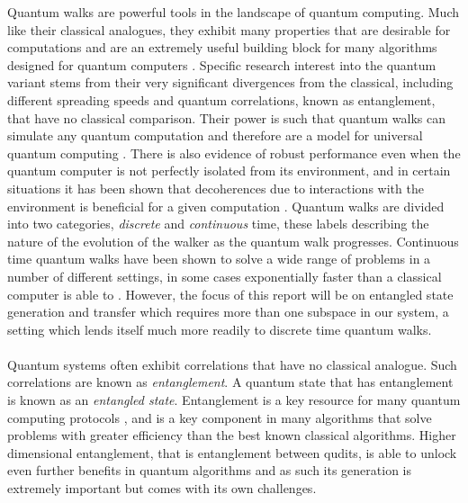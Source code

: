 Quantum walks are powerful tools in the landscape of quantum computing. 
Much like their classical analogues, they exhibit many properties that are desirable for computations and are an extremely useful building block for many algorithms designed for quantum computers \cite{shenvi2003}. 
Specific research interest into the quantum variant stems from their very significant divergences from the classical, including different spreading speeds and quantum correlations, known as entanglement, that have no classical comparison. 
Their power is such that quantum walks can simulate any quantum computation and therefore are a model for universal quantum computing \cite{Childs_2009}.
There is also evidence of robust performance even when the quantum computer is not perfectly isolated from its environment, and in certain situations it has been shown that decoherences due to interactions with the environment is beneficial for a given computation \cite{KENDON_2007}. 
Quantum walks are divided into two categories, \emph{discrete} and \emph{continuous} time, these labels describing the nature of the evolution of the walker as the quantum walk progresses.
Continuous time quantum walks have been shown to solve a wide range of problems in a number of different settings, in some cases exponentially faster than a classical computer is able to \cite{Childs_2003}. 
However, the focus of this report will be on entangled state generation and transfer which requires more than one subspace in our system, a setting which lends itself much more readily to discrete time quantum walks.\paragraph{}

Quantum systems often exhibit correlations that have no classical analogue. Such correlations are known as \emph{entanglement}. 
A quantum state that has entanglement is known as an \emph{entangled state}. 
Entanglement is a key resource for many quantum computing protocols \cite{qkd,Superdense,qteleport}, and is a key component in many algorithms that solve problems with greater efficiency than the best known classical algorithms. 
Higher dimensional entanglement, that is entanglement between qudits, is able to unlock even further benefits in quantum algorithms and as such its generation is extremely important but comes with its own challenges. \paragraph{}

